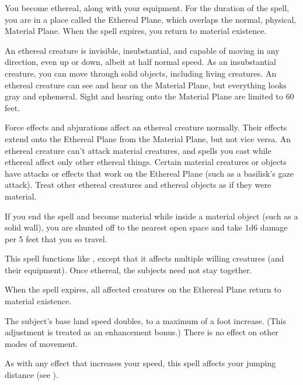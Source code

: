 \spelldur{\durshort \dismissable}
\begin{spelleffect}
    You become ethereal, along with your equipment. For the duration of the spell, you are in a place called the Ethereal Plane, which overlaps the normal, physical, Material Plane. When the spell expires, you return to material existence.
    \par An ethereal creature is invisible, insubstantial, and capable of moving in any direction, even up or down, albeit at half normal speed. As an insubstantial creature, you can move through solid objects, including living creatures. An ethereal creature can see and hear on the Material Plane, but everything looks gray and ephemeral. Sight and hearing onto the Material Plane are limited to 60 feet.
    \par Force effects and abjurations affect an ethereal creature normally. Their effects extend onto the Ethereal Plane from the Material Plane, but not vice versa. An ethereal creature can't attack material creatures, and spells you cast while ethereal affect only other ethereal things. Certain material creatures or objects have attacks or effects that work on the Ethereal Plane (such as a basilisk's gaze attack). Treat other ethereal creatures and ethereal objects as if they were material. 
    \par If you end the spell and become material while inside a material object (such as a solid wall), you are shunted off to the nearest open space and take 1d6 damage per 5 feet that you so travel.
\end{spelleffect}

\begin{spelleffect}
    This spell functions like , except that it affects multiple willing creatures (and their equipment). Once ethereal, the subjects need not stay together.
\end{spelleffect}
\begin{spellnotes}
    When the spell expires, all affected creatures on the Ethereal Plane return to material existence.
\end{spellnotes}

\spelldur{\durshort \dismissable}
\begin{spelleffect}
    The subject's base land speed doubles, to a maximum of a  foot increase. (This adjustment is treated as an enhancement bonus.) There is no effect on other modes of movement.
\end{spelleffect}
\begin{spellnotes}
    As with any effect that increases your speed, this spell affects your jumping distance (see ).
\end{spellnotes}

